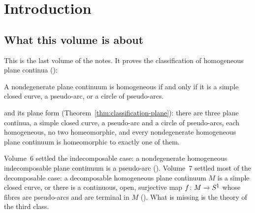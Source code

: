 \chapter{Introduction}\label{ch:intro}

\section{What this volume is about}

This is the last volume of the notes. It proves the classification of homogeneous plane continua ():

\begin{theorem}
A nondegenerate plane continuum is homogeneous if and only if it is a simple closed curve, a pseudo-arc, or a circle of pseudo-arcs.
\end{theorem}

and its plane form (Theorem~\ref{thm:classification-plane}): there are three plane continua, a simple closed curve, a pseudo-arc and a circle of
pseudo-arcs, each homogeneous, no two homeomorphic, and every nondegenerate homogeneous plane continuum is homeomorphic to exactly one of them.

Volume~6 settled the indecomposable case: a nondegenerate homogeneous indecomposable plane continuum is a pseudo-arc (). Volume~7
settled most of the decomposable case: a decomposable homogeneous plane continuum $M$ is a simple closed curve, or there is a continuous, open, surjective
map $f\colon M\to S^1$ whose fibres are pseudo-arcs and are terminal in $M$ (). What is missing is the theory of the third class.

